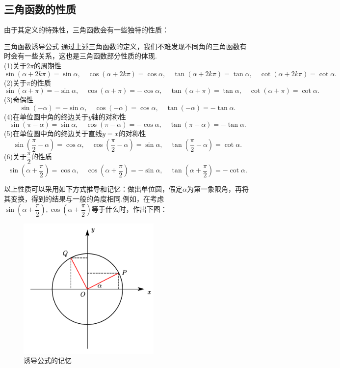 \documentclass[lang=cn, zihao=5]{elegantbook}
\newcommand{\ssb}[1]{\left( #1 \right)}
\begin{document}
\subsection{三角函数的性质}

由于其定义的特殊性，三角函数会有一些独特的性质：

\begin{proposition}{三角函数诱导公式} %
    通过上述三角函数的定义，我们不难发现不同角的三角函数有时会有一些关系，这也是三角函数部分性质的体现.\\
    (1)关于$2\pi$的周期性$$\sin{(\alpha + 2k\pi)}=\sin{\alpha}, \quad \cos{(\alpha + 2k\pi)}=\cos{\alpha}, \quad \tan{(\alpha + 2k\pi)}=\tan{\alpha}, \quad \cot{(\alpha + 2k\pi)}=\cot{\alpha}.$$
    (2)关于$\pi$的性质$$\sin{(\alpha + \pi)}=-\sin{\alpha}, \quad \cos{(\alpha + \pi)}=-\cos{\alpha}, \quad \tan{(\alpha + \pi)}=\tan{\alpha}, \quad \cot{(\alpha + \pi)}=\cot{\alpha}.$$
    (3)奇偶性$$\sin{(-\alpha)}=-\sin{\alpha}, \quad \cos{(-\alpha)}=\cos{\alpha}, \quad \tan{(-\alpha)}=-\tan{\alpha}.$$
    (4)在单位圆中角的终边关于$y$轴的对称性$$\sin{(\pi - \alpha)} = \sin{\alpha}, \quad \cos{(\pi - \alpha)} = -\cos{\alpha}, \quad \tan{(\pi - \alpha)} = -\tan{\alpha}.$$
    (5)在单位圆中角的终边关于直线$y=x$的对称性$$\sin{\ssb{\frac{\pi}{2}-\alpha}}=\cos{\alpha}, \quad \cos{\ssb{\frac{\pi}{2}-\alpha}}=\sin{\alpha}, \quad \tan{\ssb{\frac{\pi}{2}-\alpha}}=\cot{\alpha}.$$
    (6)关于$\dfrac{\pi}{2}$的性质$$\sin{\ssb{\alpha+\frac{\pi}{2}}}=\cos{\alpha}, \quad \cos{\ssb{\alpha+\frac{\pi}{2}}}=-\sin{\alpha}, \quad \tan{\ssb{\alpha+\frac{\pi}{2}}}=-\cot{\alpha}.$$
\end{proposition}

以上性质可以采用如下方式推导和记忆：做出单位圆，假定$\alpha$为第一象限角，再将其变换，得到的结果与一般的角度相同.例如，在考虑$\sin (\alpha + \dfrac{\pi}{2}),\cos (\alpha + \dfrac{\pi}{2})$等于什么时，作出下图：

\begin{figure}[H]
	\centering
	\includegraphics[width=7cm]{attachment/20230622sjjnhjuu.pdf}
	\caption{诱导公式的记忆}
\end{figure}
\end{document}
